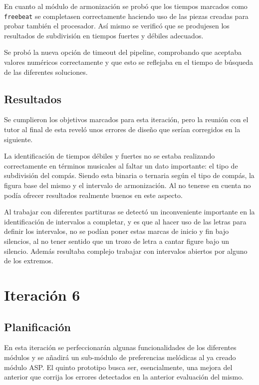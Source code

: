 En cuanto al módulo de armonización se probó que los tiempos marcados como \texttt{freebeat} se completasen correctamente haciendo uso de las piezas creadas para probar también el procesador. Así mismo se verificó que se produjesen los resultados de subdivisión en tiempos fuertes y débiles adecuados.

Se probó la nueva opción de timeout del pipeline, comprobando que aceptaba valores numéricos correctamente y que esto se reflejaba en el tiempo de búsqueda de las diferentes soluciones. 

\subsection{Resultados}
Se cumplieron los objetivos marcados para esta iteración, pero la reunión con el tutor al final de esta reveló unos errores de diseño que serían corregidos en la siguiente.

La identificación de tiempos débiles y fuertes no se estaba realizando correctamente en términos musicales al faltar un dato importante: el tipo de subdivisión del compás. Siendo esta binaria o ternaria según el tipo de compás, la figura base del mismo y el intervalo de armonización. Al no tenerse en cuenta no podía ofrecer resultados realmente buenos en este aspecto.

Al trabajar con diferentes partituras se detectó un inconveniente importante en la identificación de intervalos a completar, y es que al hacer uso de las letras para definir los intervalos, no se podían poner estas marcas de inicio y fin bajo silencios, al no tener sentido que un trozo de letra a cantar figure bajo un silencio. Además resultaba complejo trabajar con intervalos abiertos por alguno de los extremos.

\section{Iteración 6}
\subsection{Planificación}
 En esta iteración se perfeccionarán algunas funcionalidades de los diferentes módulos y se añadirá un sub-módulo de preferencias melódicas al ya creado módulo ASP. El quinto prototipo busca ser, esencialmente, una mejora del anterior que corrija los errores detectados en la anterior evaluación del mismo.

